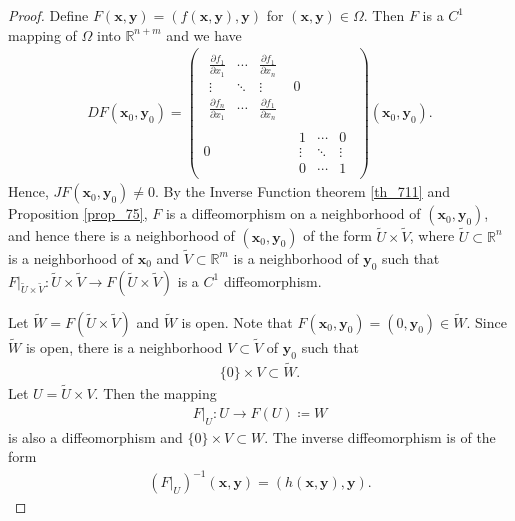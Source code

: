 \documentclass[11pt]{book}
\theoremstyle{definition}
\numberwithin{equation}{chapter}
\begin{document}
\begin{proof}
Define $F(\mathbf{x},\mathbf{y}) = \left(f(\mathbf{x},\mathbf{y}), \mathbf{y}\right)$ for $(\mathbf{x},\mathbf{y}) \in \Omega$. Then $F$ is a $C^1$ mapping of $\Omega$ into $\mathbb{R}^{n+m}$ and we have
\begin{align*}
    DF(\mathbf{x}_0,\mathbf{y}_0) = 
    \begin{pmatrix}
        \begin{matrix}
            \frac{\partial f_1}{\partial x_1} & \cdots & \frac{\partial f_1}{\partial x_n} \\
            \vdots & \ddots & \vdots \\
            \frac{\partial f_n}{\partial x_1} & \cdots & \frac{\partial f_1}{\partial x_n}
        \end{matrix} & 0 \\
        0 & \begin{matrix}
            1 & \cdots & 0 \\
            \vdots & \ddots & \vdots \\
            0 & \cdots & 1
        \end{matrix}
    \end{pmatrix}(\mathbf{x}_0,\mathbf{y}_0).
\end{align*}
Hence, $JF(\mathbf{x}_0,\mathbf{y}_0) \neq 0$. By the Inverse Function theorem \ref{th_711} and Proposition \ref{prop_75}, $F$ is a diffeomorphism on a neighborhood of $(\mathbf{x}_0,\mathbf{y}_0)$, and hence there is a neighborhood of $(\mathbf{x}_0,\mathbf{y}_0)$ of the form $\widetilde{U} \times \widetilde{V}$, where $\widetilde{U} \subset \mathbb{R}^n$ is a neighborhood of $\mathbf{x}_0$ and $\widetilde{V} \subset \mathbb{R}^m$ is a neighborhood of $\mathbf{y}_0$ such that $F|_{\widetilde{U} \times \widetilde{V}}: \widetilde{U} \times \widetilde{V} \to F(\widetilde{U} \times \widetilde{V})$ is a $C^1$ diffeomorphism. 

Let $\widetilde{W} = F(\widetilde{U} \times \widetilde{V})$ and $\widetilde{W}$ is open. Note that $F(\mathbf{x}_0,\mathbf{y}_0) = (0,\mathbf{y}_0) \in \widetilde{W}$. Since $\widetilde{W}$ is open, there is a neighborhood $V \subset \widetilde{V}$ of $\mathbf{y}_0$ such that 
\begin{align*}
    \{0\} \times V \subset \widetilde{W}.
\end{align*}
Let $U = \widetilde{U} \times V$. Then the mapping
\begin{align*}
    F|_{U}: U \to F(U) \coloneqq W
\end{align*}
is also a diffeomorphism and $\{0\} \times V \subset W$. The inverse diffeomorphism is of the form
\begin{align*}
    \left(F|_{U}\right)^{-1}(\mathbf{x}, \mathbf{y}) = (h(\mathbf{x}, \mathbf{y}), \mathbf{y}).
\end{align*}


\end{proof}
\end{document}
